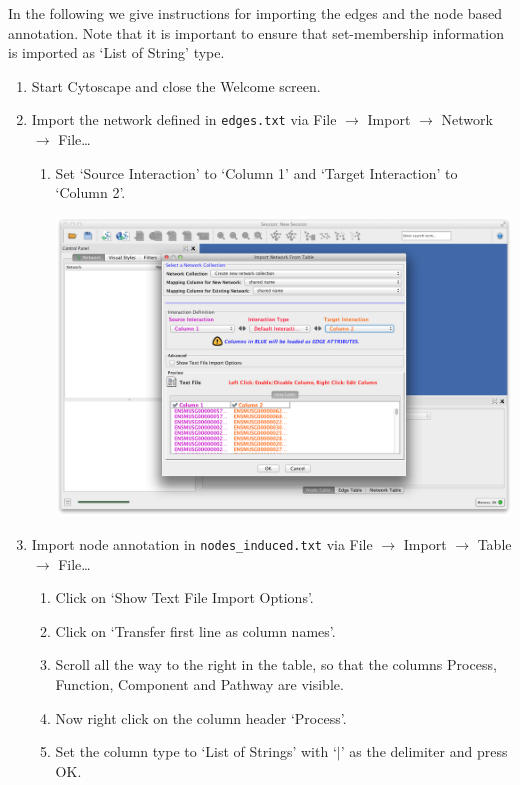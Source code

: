 \documentclass[a4paper,11pt]{article}
\begin{document}
In the following we give instructions for importing the edges and the node based
annotation. Note that it is important to ensure that set-membership
information is imported as `List of String' type.

\begin{enumerate}
  \item Start Cytoscape and close the Welcome screen.
  \item Import the network defined in \texttt{edges.txt} via File $\rightarrow$
    Import $\rightarrow$ Network $\rightarrow$ File\ldots
  \begin{enumerate}
    \item Set `Source Interaction' to `Column 1' and `Target Interaction' to
      `Column 2'.
      \begin{center}
        \includegraphics[width=.9\textwidth]{images/1.png}
      \end{center}
    \end{enumerate}
  \item Import node annotation in \texttt{nodes\_induced.txt} via File
    $\rightarrow$ Import $\rightarrow$ Table $\rightarrow$ File\ldots
    \begin{enumerate}
      \item Click on `Show Text File Import Options'.
      \item Click on `Transfer first line as column names'.
      \item Scroll all the way to the right in the table, so that the columns
        Process, Function, Component and Pathway are visible.
      \item Now right click on the column header `Process'.
      \item Set the column type to `List of Strings' with `$|$' as the delimiter
        and press OK.

\end{enumerate}
\end{enumerate}
\end{document}
